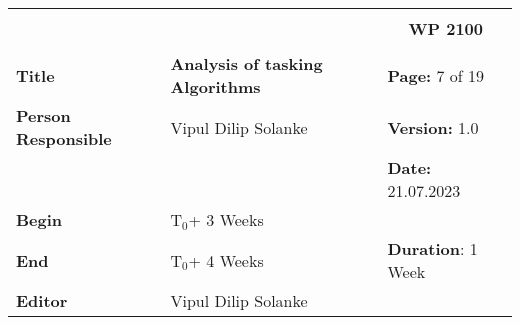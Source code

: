 \begin{table}[!h]
  \begin{center}
    \begin{tabular}{|p{35mm}||p{55mm}|p{50mm}||p{40mm}|}
      \hline
      \multicolumn{3}{|l||}{\textbf{}} & \multicolumn{1}{c|}{}                                                                                                                                                \\
      \multicolumn{3}{|l||}{\textbf{}} & \multicolumn{1}{c|}{\textbf{WP 2100}}                                                                                                                                \\
      \multicolumn{3}{|l||}{\textbf{}} & \multicolumn{1}{c|}{}                                                                                                                                                \\
      \hline\hline
      \textbf{Title}                   & \multicolumn{2}{p{7cm}||}{\textbf{Analysis of tasking Algorithms}}
                                       & \textbf{Page:} 7 of 19                                                                                                                                             \\
      \hline
      \textbf{Person Responsible}        & \multicolumn{2}{l||}{Vipul Dilip Solanke}                                                                                                   & \textbf{Version:} 1.0   \\
      \hline
      \multicolumn{3}{|l||}{}          & \textbf{Date:} 21.07.2023                                                                                                                                          \\
      \hline\hline
      \textbf{Begin}                  & \multicolumn{2}{l||}{T$_0$+ 3 Weeks}                                                                                                                &                         \\
      \hline
      \textbf{End}                    & \multicolumn{2}{l||}{T$_0$+ 4 Weeks}                                                                                                        & \textbf{Duration}: 1 Week \\
      \hline\hline
      \textbf{Editor}              & \multicolumn{3}{l|}{Vipul Dilip Solanke}                                                                                                                              \\

\end{tabular}
\end{center}
\end{table}

